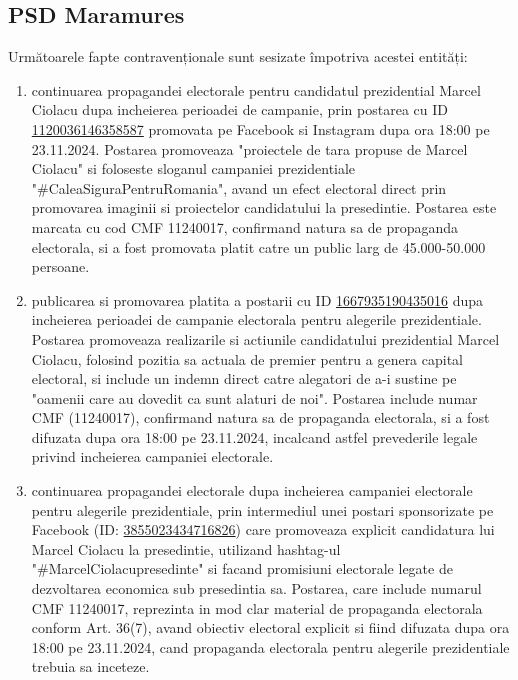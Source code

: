 \documentclass[a4paper,12pt]{article}
\begin{document}
\vspace{0.5cm}

\subsection{PSD Maramures}
Următoarele fapte contravenționale sunt sesizate împotriva acestei entități:

\begin{enumerate}[leftmargin=*, label=\arabic*.)]
    \item continuarea propagandei electorale pentru candidatul prezidential Marcel Ciolacu dupa incheierea perioadei de campanie, prin postarea cu ID \href{https://www.facebook.com/ads/library/?id=1120036146358587}{1120036146358587} promovata pe Facebook si Instagram dupa ora 18:00 pe 23.11.2024. Postarea promoveaza "proiectele de tara propuse de Marcel Ciolacu" si foloseste sloganul campaniei prezidentiale "\#CaleaSiguraPentruRomania", avand un efect electoral direct prin promovarea imaginii si proiectelor candidatului la presedintie. Postarea este marcata cu cod CMF 11240017, confirmand natura sa de propaganda electorala, si a fost promovata platit catre un public larg de 45.000-50.000 persoane.
    \item publicarea si promovarea platita a postarii cu ID \href{https://www.facebook.com/ads/library/?id=1667935190435016}{1667935190435016} dupa incheierea perioadei de campanie electorala pentru alegerile prezidentiale. Postarea promoveaza realizarile si actiunile candidatului prezidential Marcel Ciolacu, folosind pozitia sa actuala de premier pentru a genera capital electoral, si include un indemn direct catre alegatori de a-i sustine pe "oamenii care au dovedit ca sunt alaturi de noi". Postarea include numar CMF (11240017), confirmand natura sa de propaganda electorala, si a fost difuzata dupa ora 18:00 pe 23.11.2024, incalcand astfel prevederile legale privind incheierea campaniei electorale.
    \item continuarea propagandei electorale dupa incheierea campaniei electorale pentru alegerile prezidentiale, prin intermediul unei postari sponsorizate pe Facebook (ID: \href{https://www.facebook.com/ads/library/?id=3855023434716826}{3855023434716826}) care promoveaza explicit candidatura lui Marcel Ciolacu la presedintie, utilizand hashtag-ul "\#MarcelCiolacupresedinte" si facand promisiuni electorale legate de dezvoltarea economica sub presedintia sa. Postarea, care include numarul CMF 11240017, reprezinta in mod clar material de propaganda electorala conform Art. 36(7), avand obiectiv electoral explicit si fiind difuzata dupa ora 18:00 pe 23.11.2024, cand propaganda electorala pentru alegerile prezidentiale trebuia sa inceteze.
\end{enumerate}
\end{document}
